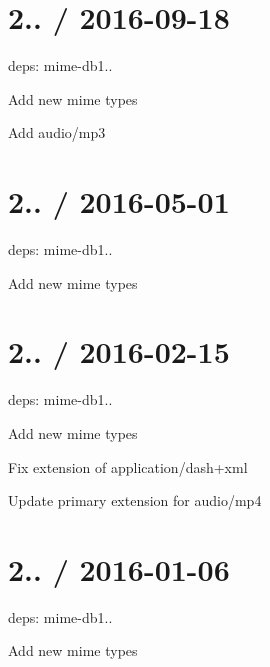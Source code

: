 \section*{2.. / 2016-\/09-\/18 }


\begin{DoxyItemize}
\item deps\+: mime-\/db1..
\begin{DoxyItemize}
\item Add new mime types
\item Add {\ttfamily audio/mp3}
\end{DoxyItemize}
\end{DoxyItemize}

\section*{2.. / 2016-\/05-\/01 }


\begin{DoxyItemize}
\item deps\+: mime-\/db1..
\begin{DoxyItemize}
\item Add new mime types
\end{DoxyItemize}
\end{DoxyItemize}

\section*{2.. / 2016-\/02-\/15 }


\begin{DoxyItemize}
\item deps\+: mime-\/db1..
\begin{DoxyItemize}
\item Add new mime types
\item Fix extension of {\ttfamily application/dash+xml}
\item Update primary extension for {\ttfamily audio/mp4}
\end{DoxyItemize}
\end{DoxyItemize}

\section*{2.. / 2016-\/01-\/06 }


\begin{DoxyItemize}
\item deps\+: mime-\/db1..
\begin{DoxyItemize}
\item Add new mime types
\end{DoxyItemize}
\end{DoxyItemize}

